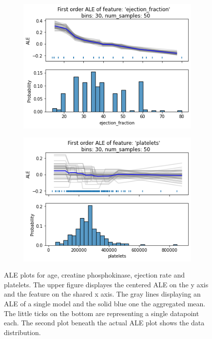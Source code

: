 \documentclass[11pt,
  a4paper,
  parskip=half, %
  BCOR=10mm, %
  english,
  ]{article}
\begin{document}
\begin{figure}[htp!]
\begin{subfigure}[t]{.49\textwidth}
        \includegraphics[width=\linewidth]{images/ALE_ejection_fraction.png}
        \caption{}
        \label{fig:ALE-1/ejection-fraction}
    \end{subfigure}
    \hfill
    \begin{subfigure}[t]{.49\textwidth}
        \includegraphics[width=\linewidth]{images/ALE_platelets.png}
        \caption{}
        \label{fig:ALE-1/platelets}
    \end{subfigure}
    \caption{ALE plots for age, creatine phosphokinase, ejection rate and platelets. The upper figure displayes the centered ALE on the y axis and the feature on the shared x axis. The gray lines displaying an ALE of a single model and the solid blue one the aggregated mean. The little ticks on the bottom are representing a single datapoint each. The second plot beneath the actual ALE plot shows the data distribution. }
    \label{fig:ALE-1}
\end{figure}
\end{document}
